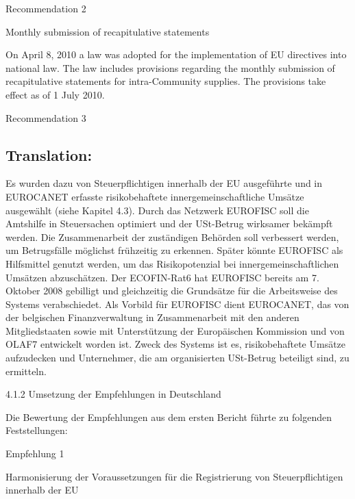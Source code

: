 \documentclass[10pt]{article}
\begin{document}
Recommendation 2



Monthly submission of recapitulative statements

On April 8, 2010 a law was adopted for the implementation of EU directives into national law.
The law includes provisions regarding the monthly submission of recapitulative statements for intra-Community supplies.
The provisions take effect as of 1 July 2010.


Recommendation 3



\pagebreak

\subsection*{Translation:}

Es wurden dazu von Steuerpflichtigen innerhalb der EU ausgeführte und in EUROCANET erfasste risikobehaftete innergemeinschaftliche Umsätze ausgewählt (siehe Kapitel 4.3).
Durch das Netzwerk EUROFISC soll die Amtshilfe in Steuersachen optimiert und der USt-Betrug wirksamer bekämpft werden. Die Zusammenarbeit der zuständigen Behörden soll verbessert werden, um Betrugsfälle möglichst frühzeitig zu erkennen.
Später könnte EUROFISC als Hilfsmittel genutzt werden, um das Risikopotenzial bei innergemeinschaftlichen Umsätzen abzuschätzen.
Der ECOFIN-Rat6 hat EUROFISC bereits am 7. Oktober 2008 gebilligt und gleichzeitig die Grundsätze für die Arbeitsweise des Systems verabschiedet.
Als Vorbild für EUROFISC dient EUROCANET, das von der belgischen Finanzverwaltung in Zusammenarbeit mit den anderen Mitgliedstaaten sowie mit Unterstützung der Europäischen Kommission und von OLAF7 entwickelt worden ist.
Zweck des Systems ist es, risikobehaftete Umsätze aufzudecken und Unternehmer, die am organisierten USt-Betrug beteiligt sind, zu ermitteln.


4.1.2 Umsetzung der Empfehlungen in Deutschland



Die Bewertung der Empfehlungen aus dem ersten Bericht führte zu folgenden Feststellungen:



Empfehlung 1



Harmonisierung der Voraussetzungen für die Registrierung von Steuerpflichtigen innerhalb der EU
\end{document}
